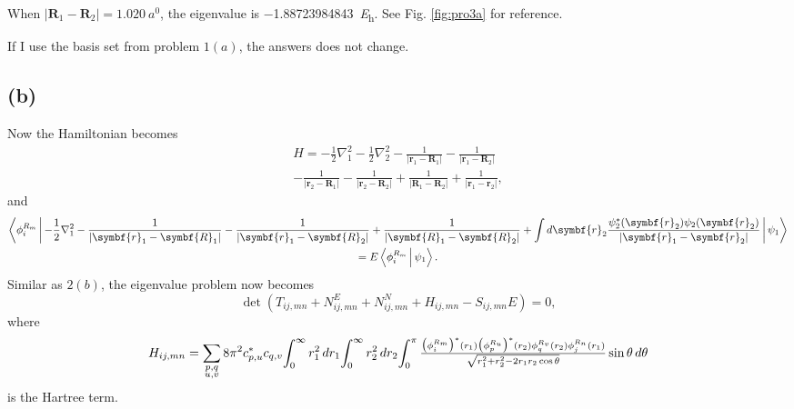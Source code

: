 \documentclass[12pt]{article}
\begin{document}
When $\lvert \symbf{R}_1 - \symbf{R}_2 \rvert = \SI{1.020}{\bohr}$, the eigenvalue is \SI{-1.88723984843}{\hartree}.
See Fig. \ref{fig:pro3a} for reference.


If I use the basis set from problem $1(a)$, the answers does not change.

\subsection*{(b)}

Now the Hamiltonian becomes
\begin{multline}
    H = - \frac{1}{2}\nabla_1^2
    - \frac{1}{2}\nabla_2^2
    - \frac{1}{\lvert \symbf{r}_1 - \symbf{R}_1 \rvert} - \frac{1}{\lvert \symbf{r}_1 - \symbf{R}_2 \rvert}\\
    - \frac{1}{\lvert \symbf{r}_2 - \symbf{R}_1 \rvert} - \frac{1}{\lvert \symbf{r}_2 - \symbf{R}_2 \rvert}
    + \frac{1}{\lvert \symbf{R}_1 - \symbf{R}_2 \rvert} + \frac{1}{\lvert \symbf{r}_1 - \symbf{r}_2 \rvert},
\end{multline}
and
\begin{multline}
    \Braket{\phi_i^{R_m} |
        - \frac{1}{2}\nabla_1^2
        - \frac{1}{\lvert \symbf{r}_1 - \symbf{R}_1 \rvert}
        - \frac{1}{\lvert \symbf{r}_1 - \symbf{R}_2 \rvert}
        + \frac{1}{\lvert \symbf{R}_1 -
            \symbf{R}_2 \rvert}
        + \int d\symbf{r}_2 \frac{ \psi_2 ^\ast  (\symbf{r}_2) \psi_2(\symbf{r}_2)}{\lvert \symbf{r}_1 - \symbf{r}_2 \rvert}
        |  \psi_1}\\
    = E \Braket{\phi_i^{R_m} | \psi_1}.
\end{multline}
Similar as $2(b)$, the eigenvalue problem now becomes
\begin{equation}
    \det(T_{ij, mn} + N^E_{ij, mn} + N^N_{ij, mn} + H_{ij, mn} - S_{ij, mn} E ) = 0,
\end{equation}
where
\begin{multline}
    H_{ij, mn} = \sum_{\substack{p, q\\u, v}} 8\pi^2 c_{p, u}^\ast c_{q, v}
    \!\int_{0}^{\infty} r_1^2  \, dr_1
    \!\int_{0}^{\infty} r_2^2 \, dr_2
    \!\int_{0}^{\pi}
    \tfrac{\big( \phi_i^{R_m} \big)^\ast(r_1) \big(\phi_p^{R_u} \big)^\ast(r_2) %
        \phi_q^{R_v}(r_2)\phi_j^{R_n}(r_1)}{%
        \sqrt{r_1^2 + r_2^2 - 2 r_1 r_2 \cos\theta}} \sin\theta \, d\theta
\end{multline}
is the Hartree term.
\end{document}
